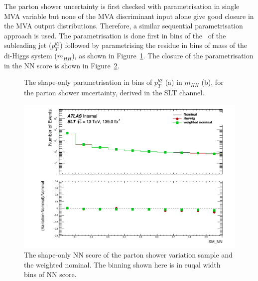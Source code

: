 The parton shower uncertainty is first checked with 
parametrisation in single MVA variable
but none of the MVA discriminant input alone give good closure in the MVA output distributions. 
Therefore, a similar sequential parametrisation approach is used.
The parametrisation is done first 
in bins of the \pt\ of the subleading jet ($p_T^{b2}$) 
followed by parametrising the residue in bins
of mass of the di-Higgs system ($m_{HH}$), 
as shown in Figure~\ref{fig:ttbarsyst_lephad_herwig}.
The closure of the parametrisation in the NN score is shown in 
Figure~\ref{fig:ttbarsyst_lephad_herwig_NN}.
\begin{figure}
\caption{The shape-only parametrisation in bins of $p_T^{b2}$ (a)
in $m_{HH}$ (b), for the parton shower uncertainty, derived in the 
SLT channel.}
\label{fig:ttbarsyst_lephad_herwig}
\end{figure}

\begin{figure}
\centering
\includegraphics[width=.49\textwidth]{figures/lephad_modelling_systs/SLT/Herwig/Hist_and_ratio_SM_NN_Norm.pdf}
\caption{The shape-only NN score of the parton shower variation sample and the weighted nominal.
The binning shown here is in euqal width bins of NN score. }
\label{fig:ttbarsyst_lephad_herwig_NN}
\end{figure}



